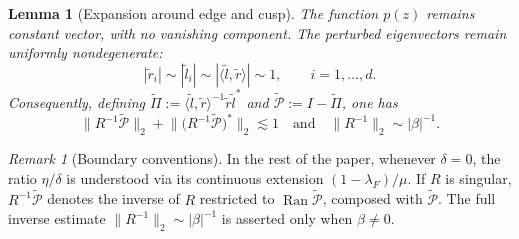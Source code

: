 \documentclass[11pt,twoside, a4paper]{article}
\numberwithin{equation}{section}
\numberwithin{figure}{section}
\theoremstyle{plain} %
\newtheorem{lemma}[theorem]{Lemma}
\theoremstyle{definition}
\theoremstyle{remark}
\newtheorem{remark}[theorem]{Remark}
\newcommand{\1} {\mspace{1 mu}}
\newcommand{\2} {\mspace{2 mu}}
\begin{document}
\begin{lemma}[Expansion around edge and cusp]
The function $p(z)$ remains constant vector, with no vanishing component. The perturbed eigenvectors remain uniformly nondegenerate: 
\begin{equation}\label{eq.tilde-rl-length}
|\tilde{r}_i|\sim|\tilde{l}_i|\sim |\langle\tilde{l},\tilde{r}\rangle|\sim 1,\qquad i=1,\dots,d.
\end{equation}
Consequently, defining $\widetilde{\Pi}:=\langle \tilde{l},\tilde{r}\rangle^{-1}\tilde{r}\tilde{l}^*$ and $\widetilde{\mathcal{P}}:=I-\widetilde{\Pi}$, one has
\begin{equation}\label{eq.Rinverse-bound}
  \big\|R^{-1}\widetilde{\mathcal{P}}\big\|_2+\big\|\big(R^{-1}\widetilde{\mathcal{P}}\big)^*\big\|_2\lesssim 1\quad\text{and}\quad \|R^{-1}\|_2\sim|\beta|^{-1}.
\end{equation}
\end{lemma}

\begin{remark}[Boundary conventions]
In the rest of the paper, whenever $\delta=0$, the ratio
$\eta/\delta$ is understood via its continuous extension
$(1-\lambda_F)/\mu$. If $R$ is singular,
$R^{-1}\widetilde{\mathcal P}$ denotes the inverse of $R$
restricted to $\operatorname{Ran}\widetilde{\mathcal P}$,
composed with $\widetilde{\mathcal P}$.
The full inverse estimate
$\|R^{-1}\|_2\sim|\beta|^{-1}$
is asserted only when $\beta\neq0$.
\end{remark}
\end{document}
